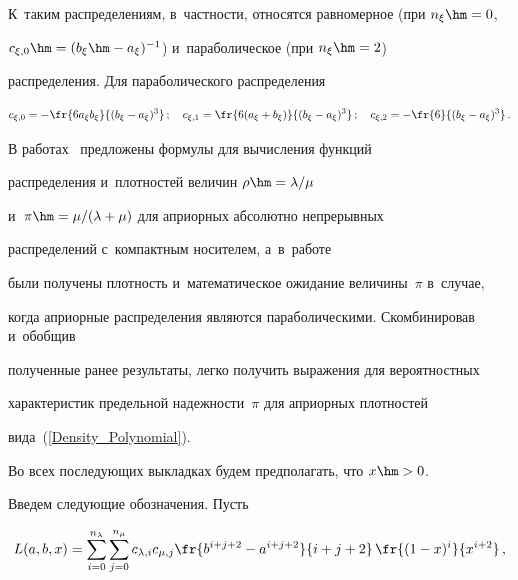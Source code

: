 \noindent


К~таким распределениям, в~частности, относятся равномерное (при $n_\xi\hm=0$, 


$c_{\xi,0} \hm= (b_\xi\hm-a_\xi)^{-1}$) и~параболическое (при $n_\xi\hm=2$) 


распределения. Для параболического распределения


\begin{equation}


\label{Const_Polynomial}


c_{\xi,0} = - \fr{6a_\xi b_\xi}{(b_\xi-a_\xi)^3}\,;\quad


c_{\xi,1} = \fr{6(a_\xi + b_\xi)}{(b_\xi-a_\xi)^3}\,;\quad


c_{\xi,2} =- \fr{6}{(b_\xi-a_\xi)^3}\,.


\end{equation}





В работах~\cite{K2016_1,K2016_2} предложены формулы для вычисления функций 


распределения и~плотностей величин $\rho\hm=\lambda/\mu$ 


и~$\pi\hm=\mu/(\lambda+\mu)$ для априорных абсолютно непрерывных 


распределений с~компактным носителем, а~в~работе~\cite{KP2016}


 были получены плотность и~математическое ожидание величины~$\pi$ в~случае, 


 когда априорные распределения являются параболическими. Скомбинировав и~обобщив 


 полученные ранее результаты, легко получить выражения для вероятностных 


 характеристик предельной надежности~$\pi$  для априорных плотностей 


 вида~(\ref{Density_Polynomial}).





Во всех последующих выкладках будем предполагать, что $x\hm>0$. 


Введем следующие обозначения. Пусть


\begin{equation}


\label{Integral_Generalized}


L(a,b,x)=


\sum\limits_{i=0}^{n_\lambda}\sum\limits_{j=0}^{n_\mu}c_{\lambda,i}


c_{\mu,j} \fr{b^{i+j+2}-a^{i+j+2}}{i+j+2} \,\fr{(1-x)^i}{x^{i+2}}\,,


\end{equation}


